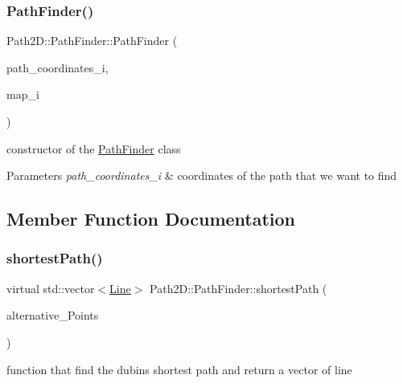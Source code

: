 \subsubsection{\texorpdfstring{Path\+Finder()}{PathFinder()}}
{\footnotesize\ttfamily Path2\+D\+::\+Path\+Finder\+::\+Path\+Finder (\begin{DoxyParamCaption}\item[{\mbox{\hyperlink{class_path2_d_1_1_element_1_1_path_coordinates}{Path\+Coordinates}}}]{path\+\_\+coordinates\+\_\+i,  }\item[{\mbox{\hyperlink{class_map}{Map}} $\ast$}]{map\+\_\+i }\end{DoxyParamCaption})}



constructor of the \mbox{\hyperlink{class_path2_d_1_1_path_finder}{Path\+Finder}} class 


\begin{DoxyParams}{Parameters}
{\em path\+\_\+coordinates\+\_\+i} & coordinates of the path that we want to find \\
\hline
\end{DoxyParams}


\subsection{Member Function Documentation}
\mbox{\label{class_path2_d_1_1_path_finder_a5d050326067c313925d87ac37612a181}} 
\subsubsection{\texorpdfstring{shortest\+Path()}{shortestPath()}}
{\footnotesize\ttfamily virtual std\+::vector$<$\mbox{\hyperlink{class_path2_d_1_1_element_1_1_line}{Line}}$>$ Path2\+D\+::\+Path\+Finder\+::shortest\+Path (\begin{DoxyParamCaption}\item[{std\+::vector$<$ cv\+::\+Point $>$ \&}]{alternative\+\_\+\+Points }\end{DoxyParamCaption})\hspace{0.3cm}{\ttfamily [pure virtual]}}



function that find the dubins shortest path and return a vector of line 

